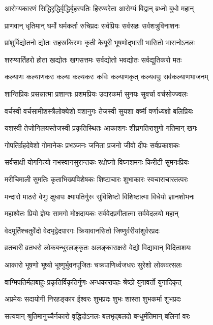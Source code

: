 \twolineshloka
{आरोग्यकारणं सिद्धिरृद्धिर्वृद्धिर्बृहस्पतिः}
{हिरण्यरेता आरोग्यं विद्वान् ब्रध्नो बुधो महान्}%

\twolineshloka
{प्राणवान् धृतिमान् घर्मो घर्मकर्ता रुचिप्रदः}
{सर्वप्रियः सर्वसहः सर्वशत्रुविनाशनः}%

\twolineshloka
{प्रांशुर्विद्योतनो द्योतः सहस्रकिरणः कृती}
{केयूरी भूषणोद्भासी भासितो भासनोऽनलः}%

\twolineshloka
{शरण्यार्तिहरो होता खद्योतः खगसत्तमः}
{सर्वद्योतो भवद्योतः सर्वद्युतिकरो मतः}%

\twolineshloka
{कल्याणः कल्याणकरः कल्यः कल्यकरः कविः}
{कल्याणकृत् कल्यवपुः सर्वकल्याणभाजनम्}%

\twolineshloka
{शान्तिप्रियः प्रसन्नात्मा प्रशान्तः प्रशमप्रियः}
{उदारकर्मा सुनयः सुवर्चा वर्चसोज्ज्वलः}%

\twolineshloka
{वर्चस्वी वर्चसामीशस्त्रैलोक्येशो वशानुगः}
{तेजस्वी सुयशा वर्ष्मी वर्णाध्यक्षो बलिप्रियः}%

\twolineshloka
{यशस्वी तेजोनिलयस्तेजस्वी प्रकृतिस्थितः}
{आकाशगः शीघ्रगतिराशुगो गतिमान् खगः}%

\twolineshloka
{गोपतिर्ग्रहदेवेशो गोमानेकः प्रभञ्जनः}
{जनिता प्रजनो जीवो दीपः सर्वप्रकाशकः}%

\twolineshloka
{सर्वसाक्षी योगनित्यो नभस्वानसुरान्तकः}
{रक्षोघ्नो विघ्नशमनः किरीटी सुमनःप्रियः}%

\twolineshloka
{मरीचिमाली सुमतिः कृताभिख्यविशेषकः}
{शिष्टाचारः शुभाकारः स्वचाराचारतत्परः}%

\twolineshloka
{मन्दारो माठरो वेणुः क्षुधापः क्ष्मापतिर्गुरुः}
{सुविशिष्टो विशिष्टात्मा विधेयो ज्ञानशोभनः}%

\twolineshloka
{महाश्वेतः प्रियो ज्ञेयः सामगो मोक्षदायकः}
{सर्ववेदप्रगीतात्मा सर्ववेदलयो महान्}%

\twolineshloka
{वेदमूर्तिश्चतुर्वेदो वेदभृद्वेदपारगः}
{क्रियावानसितो जिष्णुर्वरीयांशुर्वरप्रदः}%

\twolineshloka
{व्रतचारी व्रतधरो लोकबन्धुरलङ्कृतः}
{अलङ्काराक्षरो वेद्यो विद्यावान् विदिताशयः}%

\twolineshloka
{आकारो भूषणो भूष्यो भूष्णुर्भुवनपूजितः}
{चक्रपाणिर्ध्वजधरः सुरेशो लोकवत्सलः}%

\twolineshloka
{वाग्मिपतिर्महाबाहुः प्रकृतिर्विकृतिर्गुणः}
{अन्धकारापहः श्रेष्ठो युगावर्तो युगादिकृत्}%

\twolineshloka
{अप्रमेयः सदायोगी निरहङ्कार ईश्वरः}
{शुभप्रदः शुभः शास्ता शुभकर्मा शुभप्रदः}%

\twolineshloka
{सत्यवान् श्रुतिमानुच्चैर्नकारो वृद्धिदोऽनलः}
{बलभृद्बलदो बन्धुर्मतिमान् बलिनां वरः}%

